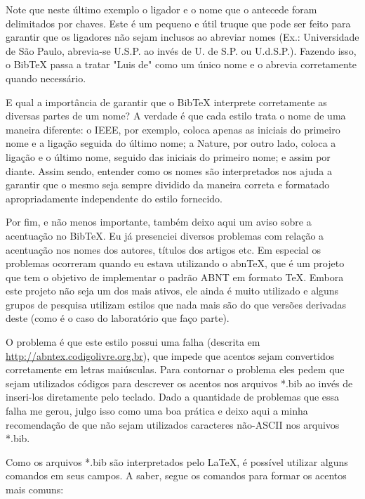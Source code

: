 \begin{anexosenv}
Note que neste último exemplo o ligador e o nome que o antecede foram
delimitados por chaves. Este é um pequeno e útil truque que pode ser feito para
garantir que os ligadores não sejam inclusos ao abreviar nomes (Ex.:
Universidade de São Paulo, abrevia-se U.S.P. ao invés de U. de S.P. ou
U.d.S.P.). Fazendo isso, o BibTeX passa a tratar "Luis de"{} como um único nome
e o abrevia corretamente quando necessário.

E qual a importância de garantir que o BibTeX interprete corretamente as
diversas partes de um nome? A verdade é que cada estilo trata o nome de uma
maneira diferente: o IEEE, por exemplo, coloca apenas as iniciais do primeiro
nome e a ligação seguida do último nome; a Nature, por outro lado, coloca a
ligação e o último nome, seguido das iniciais do primeiro nome; e assim por
diante. Assim sendo, entender como os nomes são interpretados nos ajuda a
garantir que o mesmo seja sempre dividido da maneira correta e formatado
apropriadamente independente do estilo fornecido.

Por fim, e não menos importante, também deixo aqui um aviso sobre a acentuação
no BibTeX. Eu já presenciei diversos problemas com relação a acentuação nos
nomes dos autores, títulos dos artigos etc. Em especial os problemas ocorreram
quando eu estava utilizando o abnTeX, que é um projeto que tem o objetivo de
implementar o padrão ABNT em formato TeX. Embora este projeto não seja um dos
mais ativos, ele ainda é muito utilizado e alguns grupos de pesquisa utilizam
estilos que nada mais são do que versões derivadas deste (como é o caso do
laboratório que faço parte).

O problema é que este estilo possui uma falha (descrita em
\href{http://abntex.codigolivre.org.br/node5.html}{http://abntex.codigolivre.org.br}),
que impede que acentos sejam convertidos corretamente em letras maiúsculas. Para
contornar o problema eles pedem que sejam utilizados códigos para descrever os
acentos nos arquivos *.bib ao invés de inseri-los diretamente pelo teclado. Dado
a quantidade de problemas que essa falha me gerou, julgo isso como uma boa
prática e deixo aqui a minha recomendação de que não sejam utilizados caracteres
não-ASCII nos arquivos *.bib.

Como os arquivos *.bib são interpretados pelo LaTeX, é possível utilizar alguns
comandos em seus campos. A saber, segue os comandos para formar os acentos mais
comuns:
\\
\\
\\


\end{anexosenv}
